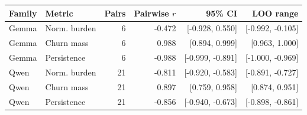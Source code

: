 \begin{tabular}{llrrrr}
\toprule
Family & Metric & Pairs & Pairwise $r$ & 95\% CI & LOO range \\
\midrule
Gemma & Norm. burden & 6 & -0.472 & [-0.928, 0.550] & [-0.992, -0.105] \\
Gemma & Churn mass & 6 & 0.988 & [0.894, 0.999] & [0.963, 1.000] \\
Gemma & Persistence & 6 & -0.988 & [-0.999, -0.891] & [-1.000, -0.969] \\
Qwen & Norm. burden & 21 & -0.811 & [-0.920, -0.583] & [-0.891, -0.727] \\
Qwen & Churn mass & 21 & 0.897 & [0.759, 0.958] & [0.874, 0.951] \\
Qwen & Persistence & 21 & -0.856 & [-0.940, -0.673] & [-0.898, -0.861] \\
\bottomrule
\end{tabular}
